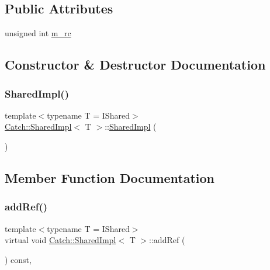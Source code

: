 \subsection*{Public Attributes}
\begin{DoxyCompactItemize}
\item 
unsigned int \hyperlink{struct_catch_1_1_shared_impl_a7e71ef1985b85aa41a1632f932a96bcb}{m\+\_\+rc}
\end{DoxyCompactItemize}


\subsection{Constructor \& Destructor Documentation}
\mbox{\label{struct_catch_1_1_shared_impl_a0629856ee353298b61ad52cf60e716fb}} 
\subsubsection{\texorpdfstring{Shared\+Impl()}{SharedImpl()}}
{\footnotesize\ttfamily template$<$typename T = I\+Shared$>$ \\
\hyperlink{struct_catch_1_1_shared_impl}{Catch\+::\+Shared\+Impl}$<$ T $>$\+::\hyperlink{struct_catch_1_1_shared_impl}{Shared\+Impl} (\begin{DoxyParamCaption}{ }\end{DoxyParamCaption})\hspace{0.3cm}{\ttfamily [inline]}}



\subsection{Member Function Documentation}
\mbox{\label{struct_catch_1_1_shared_impl_a5d1a4c96e8fc07c821890fd09749062e}} 
\subsubsection{\texorpdfstring{add\+Ref()}{addRef()}}
{\footnotesize\ttfamily template$<$typename T = I\+Shared$>$ \\
virtual void \hyperlink{struct_catch_1_1_shared_impl}{Catch\+::\+Shared\+Impl}$<$ T $>$\+::add\+Ref (\begin{DoxyParamCaption}{ }\end{DoxyParamCaption}) const\hspace{0.3cm}{\ttfamily [inline]}, {\ttfamily [virtual]}}

